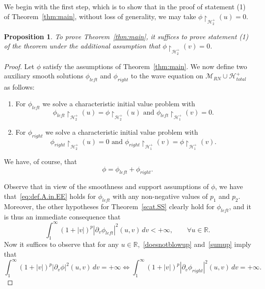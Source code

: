 \documentclass[10pt, reqno]{amsart}
\newtheorem{proposition}[theorem]{Proposition}
\theoremstyle{definition}
\theoremstyle{remark}
\numberwithin{equation}{section}
\newcommand{\rd}{\partial}
\newcommand{\0}{\emptyset}
\newcommand{\calH}{\mathcal H}
\newcommand{\EH}{\calH^{+}}
\begin{document}
We begin with the first step, which is to show that in the proof of statement (1) of Theorem~\ref{thm:main}, without loss of generality, we may take $\phi\restriction_{\mathcal{H}^+_2}(u) = 0$.
\begin{proposition} To prove Theorem~\ref{thm:main}, it suffices to prove statement (1) of the theorem under the additional assumption that $\phi\restriction_{\mathcal{H}^+_2}(v) = 0$.
\end{proposition}
\begin{proof}Let $\phi$ satisfy the assumptions of Theorem~\ref{thm:main}. We now define two auxiliary smooth solutions $\phi_{left}$ and $\phi_{right}$ to the wave equation on $\mathcal M_{RN} \cup \EH_{total}$ as follows:
\begin{enumerate}
	\item For $\phi_{left}$ we solve a characteristic initial value problem with 
	\[\phi_{left}\restriction_{\mathcal{H}^+_2}(u) = \phi\restriction_{\mathcal{H}^+_2}(u)\text{ and }\phi_{left}\restriction_{\mathcal{H}^+_1}(v) = 0.\]
	\item For $\phi_{right}$ we solve a characteristic initial value problem with 
	\[\phi_{right}\restriction_{\mathcal{H}^+_2}(u) = 0\text{ and }\phi_{right}\restriction_{\mathcal{H}^+_1}(v) = \phi\restriction_{\mathcal{H}^+_1}(v).\]
\end{enumerate}
We have, of course, that 
\begin{equation}\label{sumup}
\phi = \phi_{left} + \phi_{right}.
\end{equation}

Observe that in view of the smoothness and support assumptions of $\phi$, we have that~\eqref{eq:def.A.in.EE} holds for $\phi_{left}$ with any non-negative values of $p_1$ and $p_2$. Moreover, the other hypotheses for Theorem~\ref{scat.SS} clearly hold for $\phi_{left}$, and it is thus an immediate consequence that 
\begin{equation}\label{doesnotblowup}
\int_1^\infty (1+|v|)^{p} |\rd_v\phi_{left}|^2(u,v) \, dv < +\infty,\qquad \forall u \in \mathbb{R}.
\end{equation}
Now it suffices to observe that for any $u \in \mathbb{R}$,~\eqref{doesnotblowup} and~\eqref{sumup} imply that
\begin{equation}\label{willitblowup}
\int_1^\infty (1+|v|)^{p} |\rd_v\phi|^2(u,v) \, dv = +\infty \Leftrightarrow \int_1^\infty (1+|v|)^{p} |\rd_v\phi_{right}|^2(u,v) \, dv = +\infty.\end{equation}

\end{proof}
\end{document}
